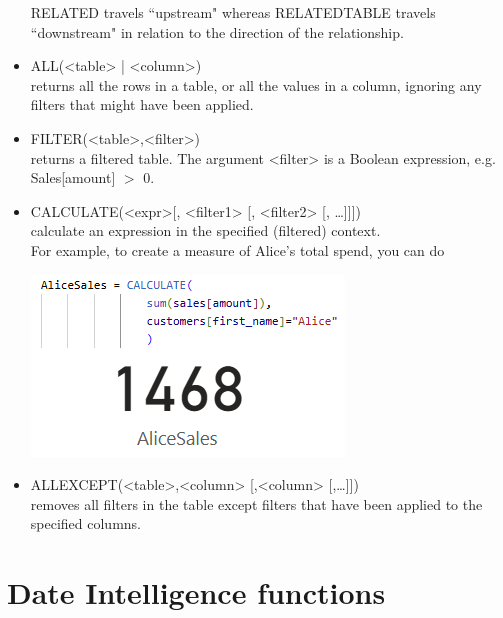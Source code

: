 \documentclass[10pt, openany, twocolumn]{book}
\begin{document}
\begin{itemize}
    \begin{tcolorbox}[colback=yellow!2!white, colframe=yellow!60!gray]    
    RELATED travels ``upstream" whereas RELATEDTABLE travels ``downstream" in relation to the direction of the relationship.
    \end{tcolorbox}
    
    \item ALL(<table> | <column>)\\ returns all the rows in a table, or all the values in a column, ignoring any filters that might have been applied.
    \item FILTER(<table>,<filter>)\\ returns a filtered table. The argument <filter> is a Boolean expression, e.g. Sales[amount] $>$ 0.
    \item CALCULATE(<expr>[, <filter1> [, <filter2> [, …]]])\\ calculate an expression in the specified (filtered) context.\\

    For example, to create a measure of Alice's total spend, you can do     
    \begin{center}
        \includegraphics[width = 0.95\columnwidth]{images/CALCULATE.png}
    \end{center} 
    \item ALLEXCEPT(<table>,<column> [,<column> [,…]])\\ removes all filters in the table except filters that have been applied to the specified columns.
\end{itemize}

\section{Date Intelligence functions}
\end{document}
